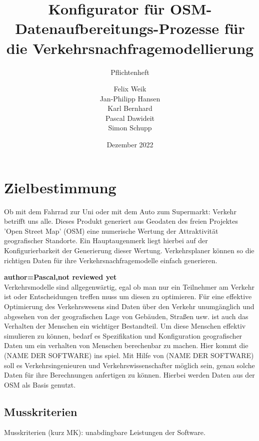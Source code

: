 \documentclass[parskip=full]{scrartcl} %
\title{Konfigurator für OSM-Datenaufbereitungs-Prozesse für die Verkehrsnachfragemodellierung}
\subtitle{Pflichtenheft}
\author{Felix Weik\\ Jan-Philipp Hansen\\ Karl Bernhard\\ Pascal Dawideit\\ Simon Schupp}
\date{Dezember 2022}
\begin{document}
\maketitle
\newpage

\tableofcontents
\newpage




\section{Zielbestimmung}
Ob mit dem Fahrrad zur Uni oder mit dem Auto zum Supermarkt: Verkehr betrifft uns alle. Dieses Produkt generiert aus Geodaten des freien Projektes 'Open Street Map' (OSM) eine numerische Wertung der Attraktivität geografischer Standorte. Ein Hauptaugenmerk liegt hierbei auf der Konfigurierbarkeit der Generierung dieser Wertung. Verkehrsplaner können so die richtigen Daten für ihre Verkehrsnachfragemodelle einfach generieren.


\textbf{author=Pascal,not reviewed yet\\}
Verkehrsmodelle sind allgegenwärtig, egal ob man nur ein Teilnehmer am Verkehr ist oder Entscheidungen treffen muss um diesen zu optimieren.
Für eine effektive Optimierung des Verkehrswesens sind Daten über den Verkehr unumgänglich und abgesehen von der geografischen Lage von Gebäuden, Straßen usw. ist auch das Verhalten der Menschen ein wichtiger Bestandteil.
Um diese Menschen effektiv simulieren zu können, bedarf es Spezifikation und Konfiguration geografischer Daten um ein verhalten von Menschen berechenbar zu machen.
Hier kommt die (NAME DER SOFTWARE) ins spiel.
Mit Hilfe von (NAME DER SOFTWARE) soll es  Verkehrsingenieuren und Verkehrswissenschafter möglich sein, genau solche Daten für ihre Berechnungen anfertigen zu können.
Hierbei werden Daten aus der OSM als Basis genutzt.

\subsection{Musskriterien}
Musskriterien (kurz MK): unabdingbare Leistungen der Software.
\end{document}
